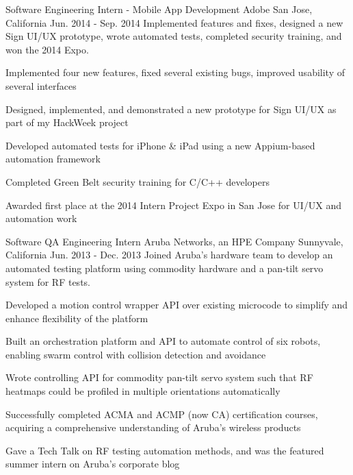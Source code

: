 \begin{cventries}
\cventry
    {Software Engineering Intern - Mobile App Development} %
    {Adobe} %
    {San Jose, California} %
    {Jun. 2014 - Sep. 2014} %
    {Implemented features and fixes, designed a new Sign UI/UX prototype, wrote automated tests, completed security training, and won the 2014 Expo.} %
    {
      \begin{cvitems} %
        \item {Implemented four new features, fixed several existing bugs, improved usability of several interfaces}
        \item {Designed, implemented, and demonstrated a new prototype for Sign UI/UX as part of my HackWeek project}
        \item {Developed automated tests for iPhone \& iPad using a new Appium-based automation framework}
        \item {Completed Green Belt security training for C/C++ developers}
        \item {Awarded first place at the 2014 Intern Project Expo in San Jose for UI/UX and automation work}
      \end{cvitems}
    }

\cventry
    {Software QA Engineering Intern} %
    {Aruba Networks, an HPE Company} %
    {Sunnyvale, California} %
    {Jun. 2013 - Dec. 2013} %
    {Joined Aruba's hardware team to develop an automated testing platform using commodity hardware and a pan-tilt servo system for RF tests.} %
    {
      \begin{cvitems} %
        \item {Developed a motion control wrapper API over existing microcode to simplify and enhance flexibility of the platform}
        \item {Built an orchestration platform and API to automate control of six robots, enabling swarm control with collision detection and avoidance}
        \item {Wrote controlling API for commodity pan-tilt servo system such that RF heatmaps could be profiled in multiple orientations automatically}
        \item {Successfully completed ACMA and ACMP (now CA) certification courses, acquiring a comprehensive understanding of Aruba's wireless products}
        \item {Gave a Tech Talk on RF testing automation methods, and was the featured summer intern on Aruba's corporate blog}
      \end{cvitems}
    }


\end{cventries}
